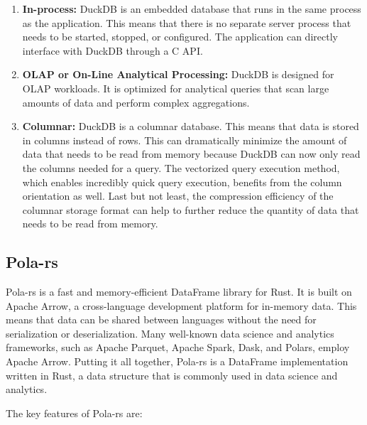 \begin{enumerate}
    \itemsep1em
    \item \textbf{In-process:} DuckDB is an embedded database that runs in the same process as the application. This means that there is no separate server process that needs to be started, stopped, or configured. The application can directly interface with DuckDB through a C API.
    \item \textbf{OLAP or On-Line Analytical Processing:} DuckDB is designed for OLAP workloads. It is optimized for analytical queries that scan large amounts of data and perform complex aggregations.
    \item \textbf{Columnar:} DuckDB is a columnar database. This means that data is stored in columns instead of rows. This can dramatically minimize the amount of data that needs to be read from memory because DuckDB can now only read the columns needed for a query. The vectorized query execution method, which enables incredibly quick query execution, benefits from the column orientation as well. Last but not least, the compression efficiency of the columnar storage format can help to further reduce the quantity of data that needs to be read from memory.
\end{enumerate}

\subsection{Pola-rs}

Pola-rs is a fast and memory-efficient DataFrame library for Rust. It is built on Apache Arrow, a cross-language development platform for in-memory data. This means that data can be shared between languages without the need for serialization or deserialization. Many well-known data science and analytics frameworks, such as Apache Parquet, Apache Spark, Dask, and Polars, employ Apache Arrow. Putting it all together, Pola-rs is a DataFrame implementation written in Rust, a data structure that is commonly used in data science and analytics.

The key features of Pola-rs are:

